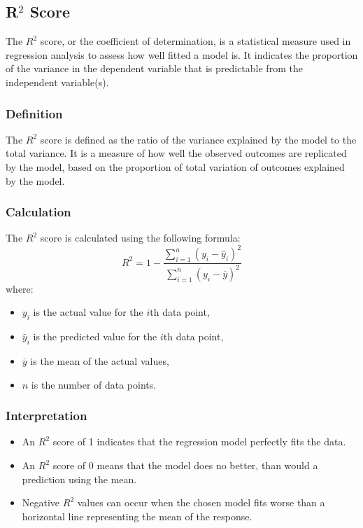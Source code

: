 \subsection{R\(^2\) Score}

The \(R^2\) score, or the coefficient of determination, is a statistical measure used in regression analysis to assess how well fitted a model is. It indicates the proportion of the variance in the dependent variable that is predictable from the independent variable(s).

\subsubsection{Definition}
The \(R^2\) score is defined as the ratio of the variance explained by the model to the total variance. It is a measure of how well the observed outcomes are replicated by the model, based on the proportion of total variation of outcomes explained by the model.

\subsubsection{Calculation}
The \(R^2\) score is calculated using the following formula:
\begin{equation}
	R^2 = 1 - \frac{\sum_{i=1}^{n} (y_i - \hat{y}_i)^2}{\sum_{i=1}^{n} (y_i - \overline{y})^2}
\end{equation}
where:
\begin{itemize}
	\item \(y_i\) is the actual value for the \(i\)th data point,
	\item \(\hat{y}_i\) is the predicted value for the \(i\)th data point,
	\item \(\overline{y}\) is the mean of the actual values,
	\item \(n\) is the number of data points.
\end{itemize}

\subsubsection{Interpretation}
\begin{itemize}
	\item An \(R^2\) score of 1 indicates that the regression model perfectly fits the data.
	\item An \(R^2\) score of 0 means that the model does no better, than would a prediction using the mean.
	\item Negative \(R^2\) values can occur when the chosen model fits worse than a horizontal line representing the mean of the response.
\end{itemize}

